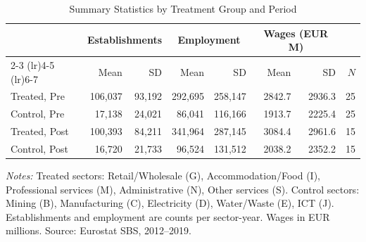 \begin{table}[htbp]
\centering
\caption{Summary Statistics by Treatment Group and Period}
\label{tab:summary}
\begin{tabular}{lrrrrrrr}
\toprule
 & \multicolumn{2}{c}{Establishments} & \multicolumn{2}{c}{Employment} & \multicolumn{2}{c}{Wages (EUR M)} & \\
\cmidrule(lr){2-3} \cmidrule(lr){4-5} \cmidrule(lr){6-7}
 & Mean & SD & Mean & SD & Mean & SD & $N$ \\
\midrule
Treated, Pre & 106,037 & 93,192 & 292,695 & 258,147 & 2842.7 & 2936.3 & 25 \\
Control, Pre & 17,138 & 24,021 & 86,041 & 116,166 & 1913.7 & 2225.4 & 25 \\
Treated, Post & 100,393 & 84,211 & 341,964 & 287,145 & 3084.4 & 2961.6 & 15 \\
Control, Post & 16,720 & 21,733 & 96,524 & 131,512 & 2038.2 & 2352.2 & 15 \\
\bottomrule
\end{tabular}
\begin{minipage}{\textwidth}
\vspace{0.5em}
\footnotesize
\textit{Notes:} Treated sectors: Retail/Wholesale (G), Accommodation/Food (I), Professional services (M), Administrative (N), Other services (S). Control sectors: Mining (B), Manufacturing (C), Electricity (D), Water/Waste (E), ICT (J). Establishments and employment are counts per sector-year. Wages in EUR millions. Source: Eurostat SBS, 2012--2019.
\end{minipage}
\end{table}
